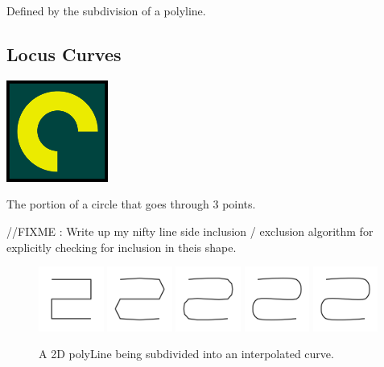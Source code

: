 \documentclass[12pt, letterpaper]{article}
\begin{document}
Defined by the subdivision of a polyline.

\subsection{Locus Curves}

\begin{center}
\includegraphics[width=0.25\textwidth]{LocusCurve.png}
\end{center}

The portion of a circle that goes through 3 points.

//FIXME : Write up my nifty line side inclusion / exclusion algorithm for explicitly checking for inclusion in theis shape.


\begin{figure}[h]
\centering
\includegraphics[width=0.19\textwidth]{SubLine0.png}
\includegraphics[width=0.19\textwidth]{SubLine1.png}
\includegraphics[width=0.19\textwidth]{SubLine2.png}
\includegraphics[width=0.19\textwidth]{SubLine3.png}
\includegraphics[width=0.19\textwidth]{SubLine4.png}
\caption{A 2D polyLine being subdivided into an interpolated curve.}
\label{fig:Sub-Line}
\end{figure}
\end{document}
